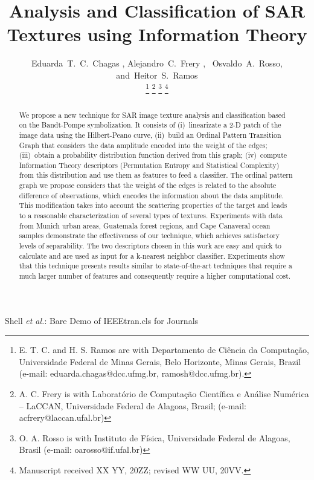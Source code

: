 \documentclass[journal]{IEEEtran}
\begin{document}
\title{Analysis and Classification of SAR Textures using Information Theory}

\author{Eduarda~T.~C.~Chagas%
        , Alejandro~C.~Frery %
        ,~
        Osvaldo~A.~Rosso, %
        and~Heitor~S.~Ramos %
        
        \thanks{E. T. C. and H. S. Ramos are with Departamento de Ci\^encia da Computa\c c\~ao, Universidade Federal de Minas Gerais, Belo Horizonte, Minas Gerais, Brazil (e-mail: eduarda.chagas@dcc.ufmg.br, ramosh@dcc.ufmg.br).}
        \thanks{A. C. Frery is with Laborat\'orio de Computa\c c\~ao Cient\'ifica e An\'alise Num\'erica -- LaCCAN, Universidade Federal de Alagoas, Brasil; (e-mail: acfrery@laccan.ufal.br)}
        \thanks{O. A. Rosso is with Instituto de F\'isica, Universidade Federal de Alagoas, Brasil (e-mail: oarosso@if.ufal.br)}
        \thanks{Manuscript received XX YY, 20ZZ; revised WW UU, 20VV.}}


{Shell \MakeLowercase{\textit{et al.}}: Bare Demo of IEEEtran.cls for Journals}

\maketitle

\begin{abstract}
   We propose a new technique for SAR image texture analysis and classification based on the Bandt-Pompe symbolization.
   It consists of
   (i)~linearizate a 2-D patch of the image data using the Hilbert-Peano curve,
   (ii)~build an Ordinal Pattern Transition Graph that considers the data amplitude encoded into the weight of the edges;
   (iii)~obtain a probability distribution function derived from this graph;
   (iv)~compute Information Theory descriptors (Permutation Entropy and Statistical Complexity) from this distribution and use them as features to feed a classifier.
   The ordinal pattern graph we propose considers that the weight of the edges is related to the absolute difference of observations, which encodes the information about the data amplitude. This modification takes into account the scattering properties of the target and leads to a reasonable characterization of several types of textures.
   Experiments with data from Munich urban areas, Guatemala forest regions, and Cape Canaveral ocean samples demonstrate the effectiveness of our technique, which achieves satisfactory levels of separability.
   The two descriptors chosen in this work are easy and quick to calculate and are used as input for a  k-nearest neighbor classifier.
   Experiments show that this technique presents results similar to state-of-the-art techniques that require a much larger number of features and consequently require a higher computational cost.
\end{abstract}
\end{document}
